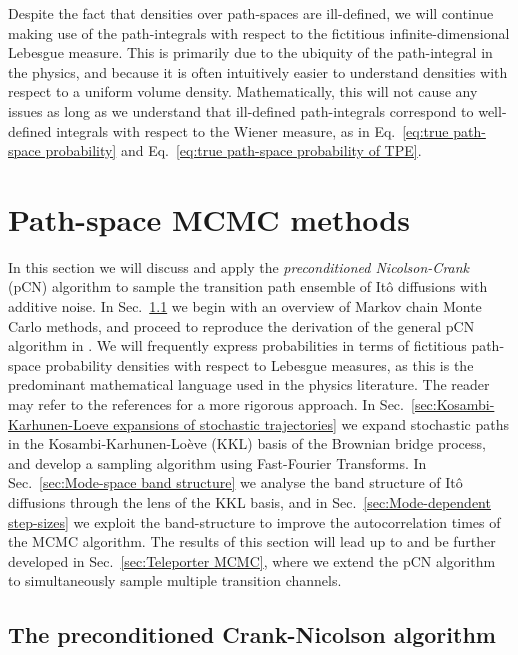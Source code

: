 Despite the fact that densities over path-spaces are ill-defined, we will continue making use of the path-integrals with respect to the fictitious infinite-dimensional Lebesgue measure. This is primarily due to the ubiquity of the path-integral in the physics, and because it is often intuitively easier to understand densities with respect to a uniform volume density. Mathematically, this will not cause any issues as long as we understand that ill-defined path-integrals correspond to well-defined integrals with respect to the Wiener measure, as in Eq.~\ref{eq:true path-space probability} and Eq.~\ref{eq:true path-space probability of TPE}.

\section{Path-space MCMC methods} \label{sec:Path-space MCMC}

In this section we will discuss and apply the \textit{preconditioned Nicolson-Crank} (pCN) algorithm to sample the transition path ensemble of It\^{o} diffusions with additive noise. In Sec.~\ref{sec:The preconditioned Crank-Nicolson algorithm} we begin with an overview of Markov chain Monte Carlo methods, and proceed to reproduce the derivation of the general pCN algorithm in \citep{cotterMCMCMethodsFunctions2013, beskosMCMCMETHODSDIFFUSION2008, hairerAnalysisSPDEsArising2005, hairerAnalysisSPDEsArising2007, hairerSpectralGapsMetropolis2014}. We will frequently express probabilities in terms of fictitious path-space probability densities with respect to Lebesgue measures, as this is the predominant mathematical language used in the physics literature. The reader may refer to the references for a more rigorous approach. In Sec.~\ref{sec:Kosambi-Karhunen-Loeve expansions of stochastic trajectories} we expand stochastic paths in the Kosambi-Karhunen-Lo\`eve (KKL) basis of the Brownian bridge process, and develop a sampling algorithm using Fast-Fourier Transforms. In Sec.~\ref{sec:Mode-space band structure} we analyse the band structure of It\^{o} diffusions through the lens of the KKL basis, and in Sec.~\ref{sec:Mode-dependent step-sizes} we exploit the band-structure to improve the autocorrelation times of the MCMC algorithm. The results of this section will lead up to and be further developed in Sec.~\ref{sec:Teleporter MCMC}, where we extend the pCN algorithm to simultaneously sample multiple transition channels. 

\subsection{The preconditioned Crank-Nicolson algorithm} \label{sec:The preconditioned Crank-Nicolson algorithm}
 
